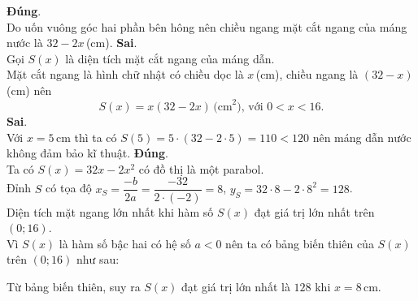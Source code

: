 \begin{ex}
\begin{ex}
{\begin{center}
		\end{center}
		\begin{itemchoice}
			\itemch \textbf{Đúng}.\\
			Do uốn vuông góc hai phần bên hông nên chiều ngang mặt cắt ngang của máng nước là $32-2x$\,(cm).
			\itemch \textbf{Sai}.\\
			Gọi $S(x)$ là diện tích mặt cắt ngang của máng dẫn.\\
			Mặt cắt ngang là hình chữ nhật có chiều dọc là $x$\,(cm), chiều ngang là $(32-x)$\,(cm) nên
			\[S(x)=x(32-2x)\,\text{(cm}^2)\text{, với }0<x<16.\]
			\itemch \textbf{Sai}.\\
			Với $x=5$\,cm thì ta có $S(5)=5\cdot(32-2\cdot5)=110<120$ nên máng dẫn nước không đảm bảo kĩ thuật.
			\itemch \textbf{Đúng}.\\
			Ta có $S(x)=32x-2x^2$ có đồ thị là một parabol.\\
			Đỉnh $S$ có tọa độ $x_S=\dfrac{-b}{2a}=\dfrac{-32}{2\cdot(-2)}=8$, $y_S=32\cdot8-2\cdot8^2=128$.\\
			Diện tích mặt ngang lớn nhất khi hàm số $S(x)$ đạt giá trị lớn nhất trên $(0;16)$.\\ 
			Vì $S(x)$ là hàm số bậc hai có hệ số $a<0$ nên ta có bảng biến thiên của $S(x)$ trên $(0;16)$ như sau:
			\begin{center}
			\end{center}
			Từ bảng biến thiên, suy ra $S(x)$ đạt giá trị lớn nhất là $128$ khi $x=8$\,cm.
		\end{itemchoice}
	}
\end{ex}



\end{ex}
